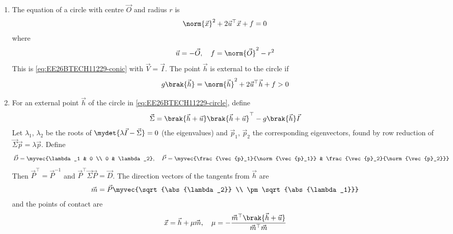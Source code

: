 \begin{enumerate}[label=\thesubsection.\arabic*, ref=\thesubsection.\theenumi]
\solution
Substituting $\vec{x} = \vec{h} + \kappa\vec{m}$ in \eqref{eq:EE26BTECH11229-conic} and using $\vec{V}^{\top} = \vec{V}$,
\begin{align}
	\brak{\vec{h} + \kappa\vec{m}}^{\top}\vec{V}\brak{\vec{h} + \kappa\vec{m}} + 2\vec{u}^{\top}\brak{\vec{h} + \kappa\vec{m}} + f = 0
\end{align}
which on expanding yields \eqref{eq:EE26BTECH11229-conic-line}.
\item The equation of a circle with centre $\vec{O}$ and radius $r$ is
\begin{align}
	\norm{\vec{x}}^2 + 2\vec{u}^{\top}\vec{x} + f = 0
	\label{eq:EE26BTECH11229-circle}
\end{align}
where
\begin{align}
	\vec{u} = -\vec{O}, \quad f = \norm{\vec{O}}^2 - r^2
\end{align}
This is \eqref{eq:EE26BTECH11229-conic} with $\vec{V} = \vec{I}$. The point $\vec{h}$ is external to the circle if
\begin{align}
	g\brak{\vec{h}} = \norm{\vec{h}}^2 + 2\vec{u}^{\top}\vec{h} + f > 0
\end{align}
\item For an external point $\vec{h}$ of the circle in \eqref{eq:EE26BTECH11229-circle}, define
\begin{align}
	\vec{\Sigma} = \brak{\vec{h}+\vec{u}}\brak{\vec{h}+\vec{u}}^{\top} - g\brak{\vec{h}}\vec{I}
	\label{eq:EE26BTECH11229-sigma}
\end{align}
Let $\lambda_1$, $\lambda_2$ be the roots of $\mydet{\lambda\vec{I} - \vec{\Sigma}} = 0$ (the eigenvalues) and $\vec{p}_1$, $\vec{p}_2$ the corresponding eigenvectors, found by row reduction of $\vec{\Sigma}\vec{p} = \lambda\vec{p}$. Define
\begin{align}
	\vec{D} = \myvec{\lambda_1 & 0 \\ 0 & \lambda_2}, \quad
	\vec{P} = \myvec{\frac{\vec{p}_1}{\norm{\vec{p}_1}} & \frac{\vec{p}_2}{\norm{\vec{p}_2}}}
\end{align}
Then $\vec{P}^{\top} = \vec{P}^{-1}$ and $\vec{P}^{\top}\vec{\Sigma}\vec{P} = \vec{D}$. The direction vectors of the tangents from $\vec{h}$ are
\begin{align}
	\vec{m} = \vec{P}\myvec{\sqrt{\abs{\lambda_2}} \\ \pm\sqrt{\abs{\lambda_1}}}
	\label{eq:EE26BTECH11229-tangent-dir}
\end{align}
and the points of contact are
\begin{align}
	\vec{x} = \vec{h} + \mu\vec{m}, \quad \mu = -\frac{\vec{m}^{\top}\brak{\vec{h}+\vec{u}}}{\vec{m}^{\top}\vec{m}}

\end{align}
\end{enumerate}
